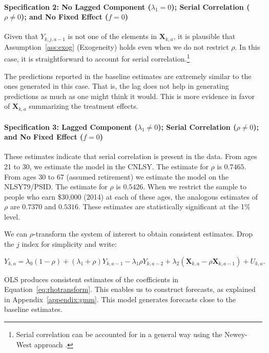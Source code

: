 \paragraph{Specification 2: No Lagged Component ($\lambda_{1} = 0$); Serial Correlation ($\rho \neq 0$); and No Fixed Effect ($f = 0$)} \label{app:spec2}

Given that $Y_{k,j,a-1}$ is not one of the elements in $\bm{X}_{k,a}$, it is plausible that Assumption~\ref{ass:exog} (Exogeneity) holds even when we do not restrict $\rho$. In this case, it is straightforward to account for serial correlation.\footnote{Serial correlation can be accounted for in a general way using the Newey-West approach \citep{Newey-West_1986_Simple-Pos}.}

The predictions reported in the baseline estimates are extremely similar to the ones generated in this case. That is, the lag does not help in generating predictions as much as one might think it would. This is more evidence in favor of $\bm{X}_{k,a}$ summarizing the treatment effects.

\paragraph{Specification 3: Lagged Component ($\lambda_{1} \neq 0$); Serial Correlation ($\rho \neq 0$); and No Fixed Effect ($f = 0$)} \label{section:laggedserial}

These estimates indicate that serial correlation is present in the data. From ages 21 to 30, we estimate the model in the CNLSY. The estimate for $\rho$ is $0.7465$. From ages 30 to 67 (assumed retirement) we estimate the model on the NLSY79/PSID. The estimate for $\rho$ is $0.5426$. When we restrict the sample to people who earn \$30,000 (2014) at each of these ages, the analogous estimates of $\rho$ are $0.7370$ and $0.5316$. These estimates are statistically significant at the 1\% level.

We can $\rho$-transform the system of interest to obtain consistent estimates. Drop the $j$ index for simplicity and write:

\begin{equation}
Y_{k,a} = \lambda_{0} \left( 1 - \rho \right) + \left( \lambda_{1} + \rho \right) Y_{k,a-1} - \lambda_{1} \rho Y_{k,a-2} + \lambda_{2} \left( \bm{X}_{k,a} - \rho \bm{X}_{k,a-1}  \right) + U_{k,a}. \label{eq:rhotransform}
\end{equation}

OLS produces consistent estimates of the coefficients in Equation~\eqref{eq:rhotransform}. This enables us to construct forecasts, as explained in Appendix~\ref{appendix:gmm}. This model generates forecasts close to the baseline estimates.

